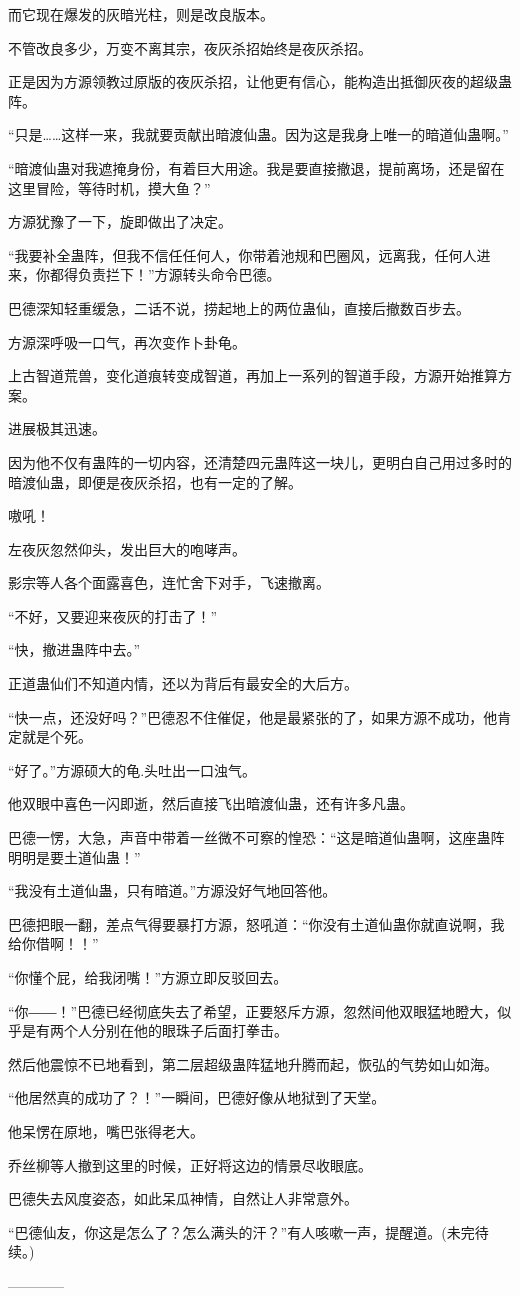 \begin{this_body}
而它现在爆发的灰暗光柱，则是改良版本。

不管改良多少，万变不离其宗，夜灰杀招始终是夜灰杀招。

正是因为方源领教过原版的夜灰杀招，让他更有信心，能构造出抵御灰夜的超级蛊阵。

“只是……这样一来，我就要贡献出暗渡仙蛊。因为这是我身上唯一的暗道仙蛊啊。”

“暗渡仙蛊对我遮掩身份，有着巨大用途。我是要直接撤退，提前离场，还是留在这里冒险，等待时机，摸大鱼？”

方源犹豫了一下，旋即做出了决定。

“我要补全蛊阵，但我不信任任何人，你带着池规和巴圈风，远离我，任何人进来，你都得负责拦下！”方源转头命令巴德。

巴德深知轻重缓急，二话不说，捞起地上的两位蛊仙，直接后撤数百步去。

方源深呼吸一口气，再次变作卜卦龟。

上古智道荒兽，变化道痕转变成智道，再加上一系列的智道手段，方源开始推算方案。

进展极其迅速。

因为他不仅有蛊阵的一切内容，还清楚四元蛊阵这一块儿，更明白自己用过多时的暗渡仙蛊，即便是夜灰杀招，也有一定的了解。

嗷吼！

左夜灰忽然仰头，发出巨大的咆哮声。

影宗等人各个面露喜色，连忙舍下对手，飞速撤离。

“不好，又要迎来夜灰的打击了！”

“快，撤进蛊阵中去。”

正道蛊仙们不知道内情，还以为背后有最安全的大后方。

“快一点，还没好吗？”巴德忍不住催促，他是最紧张的了，如果方源不成功，他肯定就是个死。

“好了。”方源硕大的龟.头吐出一口浊气。

他双眼中喜色一闪即逝，然后直接飞出暗渡仙蛊，还有许多凡蛊。

巴德一愣，大急，声音中带着一丝微不可察的惶恐：“这是暗道仙蛊啊，这座蛊阵明明是要土道仙蛊！”

“我没有土道仙蛊，只有暗道。”方源没好气地回答他。

巴德把眼一翻，差点气得要暴打方源，怒吼道：“你没有土道仙蛊你就直说啊，我给你借啊！！”

“你懂个屁，给我闭嘴！”方源立即反驳回去。

“你――！”巴德已经彻底失去了希望，正要怒斥方源，忽然间他双眼猛地瞪大，似乎是有两个人分别在他的眼珠子后面打拳击。

然后他震惊不已地看到，第二层超级蛊阵猛地升腾而起，恢弘的气势如山如海。

“他居然真的成功了？！”一瞬间，巴德好像从地狱到了天堂。

他呆愣在原地，嘴巴张得老大。

乔丝柳等人撤到这里的时候，正好将这边的情景尽收眼底。

巴德失去风度姿态，如此呆瓜神情，自然让人非常意外。

“巴德仙友，你这是怎么了？怎么满头的汗？”有人咳嗽一声，提醒道。(未完待续。)

------------

\end{this_body}

